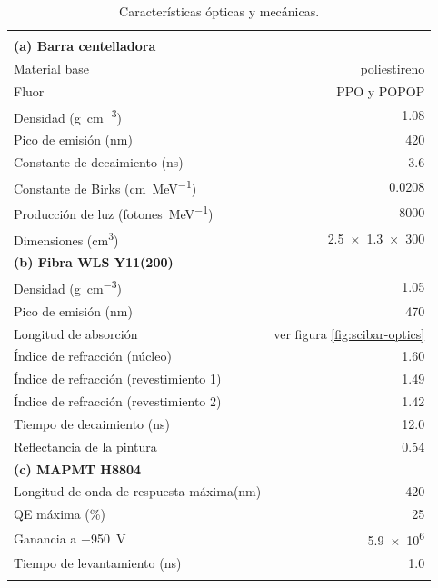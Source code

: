 \begin{table}
\caption{Características ópticas y mecánicas.}
\label{table:optics}

\begin{tabular}{lr}

\multicolumn{2}{c}{}\\
\cmidrule(r){1-2}
\addlinespace[5pt]
\textbf{(a) Barra centelladora}\\
\addlinespace[5pt]
\cmidrule(r){1-2}
Material base & poliestireno\\
Fluor & PPO y POPOP\\
Densidad (\si{\gram\per\cubic\cm}) & \num{1.08}\\
Pico de emisión (\si{\nm}) & \num{420}\\
Constante de decaimiento (\si{\ns}) & \num{3.6}\\
Constante de Birks (\si{\cm\per\mega\electronvolt}) & \num{0.0208}\\
Producción de luz (\si{fotones\per\mega\electronvolt}) & \num{8000}\\
Dimensiones (\si{\cubic\cm}) & \num[product-units=power]{2.5x1.3x300}\\
\addlinespace[10pt]
\textbf{(b) Fibra WLS Y11(200)}\\
\addlinespace[5pt]
\cmidrule(r){1-2}
Densidad (\si{\gram\per\cubic\cm}) & \num{1.05}\\
Pico de emisión (\si{\nm}) & \num{470}\\
Longitud de absorción & ver figura \ref{fig:scibar-optics}\\
Índice de refracción (núcleo) & \num{1.60}\\
Índice de refracción (revestimiento 1) & \num{1.49}\\
Índice de refracción (revestimiento 2) & \num{1.42}\\
Tiempo de decaimiento (\si{\ns}) & \num{12.0}\\
Reflectancia de la pintura & 0.54\\
\addlinespace[10pt]
\textbf{(c) MAPMT H8804}\\
\addlinespace[5pt]
\cmidrule(r){1-2}
Longitud de onda de respuesta máxima(\si{\nm}) & \num{420}\\
QE máxima (\si{\percent})  & \num{25}\\
Ganancia a \SI{-950}{\volt} & \num{5.9e6}\\
Tiempo de levantamiento (\si{\ns}) & \num{1.0}\\
\addlinespace[5pt]
\bottomrule

\end{tabular}
\end{table}

